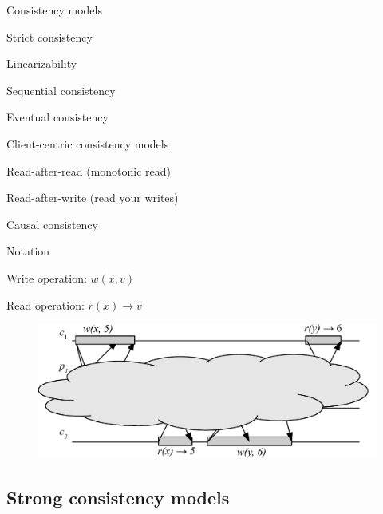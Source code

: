 \begin{frame}{Consistency models}
	
\BI
\item Strict consistency
\item Linearizability
\item Sequential consistency
\EI

\smallskip
{}
\BI
\item Eventual consistency
\item Client-centric consistency models
\BI
\item Read-after-read (monotonic read)
\item Read-after-write (read your writes)
\EI
\item Causal consistency 
\EI

\end{frame}	
	
\begin{frame}{Notation}

\BIL
\item \alert{Write operation}: $w(x,v)$
\item \alert{Read operation}: $r(x) \rightarrow v$\\
\EIL

\begin{figure}
\includegraphics[width=\textwidth]{lin-03}
\end{figure}

\end{frame}	

\subsection{Strong consistency models}


